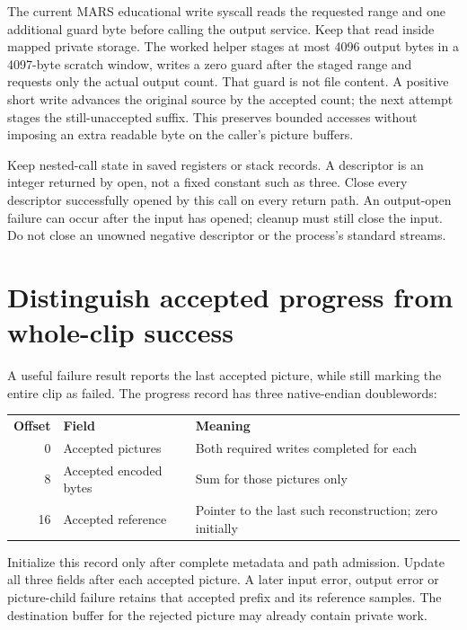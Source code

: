 The current MARS educational write syscall reads the requested range and one
additional guard byte before calling the output service. Keep that read inside
mapped private storage. The worked helper stages at most 4096 output bytes in a
4097-byte scratch window, writes a zero guard after the staged range and requests
only the actual output count. That guard is not file content. A positive short
write advances the original source by the accepted count; the next attempt stages
the still-unaccepted suffix. This preserves bounded accesses without imposing an
extra readable byte on the caller's picture buffers.

Keep nested-call state in saved registers or stack records. A descriptor is an
integer returned by open, not a fixed constant such as three. Close every descriptor
successfully opened by this call on every return path. An output-open failure
can occur after the input has opened; cleanup must still close the input. Do not
close an unowned negative descriptor or the process's standard streams.

\section{Distinguish accepted progress from whole-clip success}
A useful failure result reports the last accepted picture, while still marking
the entire clip as failed. The progress record has three native-endian doublewords:
\begin{center}
  \begin{tabular}{rll}
    \textbf{Offset} & \textbf{Field}         & \textbf{Meaning}                                        \\
    0               & Accepted pictures      & Both required writes completed for each                 \\
    8               & Accepted encoded bytes & Sum for those pictures only                             \\
    16              & Accepted reference     & Pointer to the last such reconstruction; zero initially
  \end{tabular}
\end{center}
Initialize this record only after complete metadata and path admission. Update
all three fields after each accepted picture. A later input error, output error
or picture-child failure retains that accepted prefix and its reference samples.
The destination buffer for the rejected picture may already contain private work.

